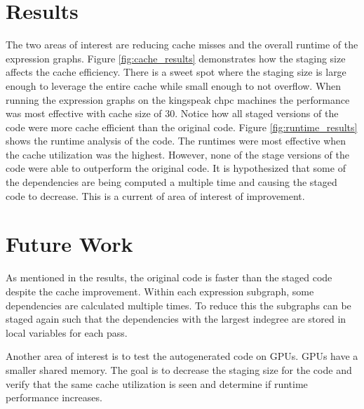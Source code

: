 \documentclass[sigconf,]{acmart}
\begin{document}
\section{Results}
The two areas of interest are reducing cache misses and the overall runtime of the expression graphs. Figure \ref{fig:cache_results} demonstrates how the staging size affects the cache efficiency. There is a sweet spot where the staging size is large enough to leverage the entire cache while small enough to not overflow. When running the expression graphs on the kingspeak chpc machines the performance was most effective with cache size of 30. Notice how all staged versions of the code were more cache efficient than the original code. 
Figure \ref{fig:runtime_results} shows the runtime analysis of the code. The runtimes were most effective when the cache utilization was the highest. However, none of the stage versions of the code were able to outperform the original code. It is hypothesized that some of the dependencies are being computed a multiple time and causing the staged code to decrease. This is a current of area of interest of improvement.


\section{Future Work}
As mentioned in the results, the original code is faster than the staged code despite the cache improvement. Within each expression subgraph, some dependencies are calculated multiple times. To reduce this the subgraphs can be staged again such that the dependencies with the largest indegree are stored in local variables for each pass.

Another area of interest is to test the autogenerated code on GPUs. GPUs have a smaller shared memory. The goal is to decrease the staging size for the code and verify that the same cache utilization is seen and determine if runtime performance increases.




\end{document}
